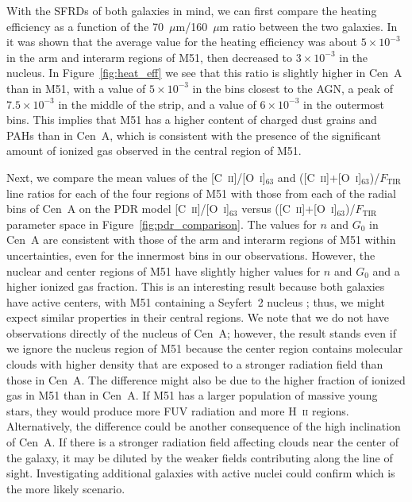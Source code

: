 With the SFRDs of both galaxies in mind, we can first compare the heating efficiency as a function of the 70~$\mu$m/160~$\mu$m ratio between the two galaxies.  In \citet{parkin_2013} it was shown that the average value for the heating efficiency was about $5 \times 10^{-3}$ in the arm and interarm regions of M51, then decreased to $3 \times 10^{-3}$ in the nucleus.  In Figure~\ref{fig:heat_eff} we see that this ratio is slightly higher in Cen~A than in M51, with a value of $5 \times 10^{-3}$ in the bins closest to the AGN, a peak of $7.5 \times 10^{-3}$ in the middle of the strip, and a value of $6 \times 10^{-3}$ in the outermost bins.  This implies that M51 has a higher content of charged dust grains and PAHs than in Cen~A, which is consistent with the presence of the significant amount of ionized gas observed in the central region of M51.

Next, we compare the mean values of the [C~\textsc{ii}]/[O~\textsc{i}]$_{63}$ and ([C~\textsc{ii}]+[O~\textsc{i}]$_{63}$)/$F_{\mathrm{TIR}}$ line ratios for each of the four regions of M51 with those from each of the radial bins of Cen~A on the PDR model [C~\textsc{ii}]/[O~\textsc{i}]$_{63}$ versus ([C~\textsc{ii}]+[O~\textsc{i}]$_{63}$)/$F_{\mathrm{TIR}}$ parameter space in Figure~\ref{fig:pdr_comparison}.  The values for $n$ and $G_{0}$ in Cen~A are consistent with those of the arm and interarm regions of M51 within uncertainties, even for the innermost bins in our observations.  However, the nuclear and center regions of M51 have slightly higher values for $n$ and $G_{0}$ and a higher ionized gas fraction.  This is an interesting result because both galaxies have active centers, with M51 containing a Seyfert~2 nucleus \citep{1997ApJS..112..315H}; thus, we might expect similar properties in their central regions.  We note that we do not have observations directly of the nucleus of Cen~A; however, the result stands even if we ignore the nucleus region of M51 because the center region contains molecular clouds with higher density that are exposed to a stronger radiation field than those in Cen~A.  The difference might also be due to the higher fraction of ionized gas in M51 than in Cen~A.  If M51 has a larger population of massive young stars, they would produce more FUV radiation and more H~\textsc{ii} regions.  Alternatively, the difference could be another consequence of the high inclination of Cen~A.  If there is a stronger radiation field affecting clouds near the center of the galaxy, it may be diluted by the weaker fields contributing along the line of sight.  Investigating additional galaxies with active nuclei could confirm which is the more likely scenario.

